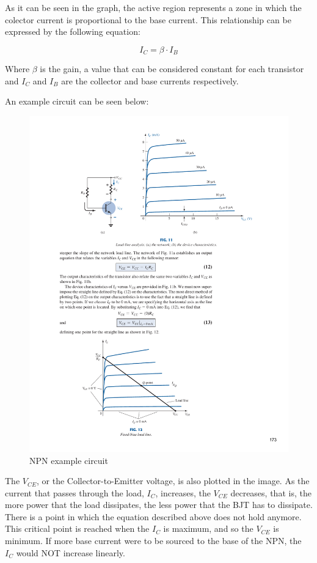 As it can be seen in the graph, the active region represents a zone in which the colector current is proportional to the base current. This relationship can be expressed by the following equation:

\begin{equation*}
    I_C = \beta \cdot I_B
\end{equation*}

\noindent Where $\beta$ is the gain, a value that can be considered constant for each transistor and $I_C$ and $I_B$ are the collector and base currents respectively. \medskip

An example circuit can be seen below:

\begin{figure}[H]
    \centering
    \includegraphics[scale = 1]{Graphics/VHDL/Practice 8/BJT/NPN_CIRCUIT.pdf}
    \caption{NPN example circuit~\autocite{BOYLESTAD}}
    \label{fig:NPN_EXAMPLE}
\end{figure}

The $V_{CE}$, or the Collector-to-Emitter voltage, is also plotted in the image. As the current that passes through the load, $I_C$, increases, the $V_{CE}$ decreases, that is, the more power that the load dissipates, the less power that the BJT has to dissipate. There is a point in which the equation described above does not hold anymore. This critical point is reached when the $I_C$ is maximum, and so the $V_{CE}$ is minimum. If more base current were to be sourced to the base of the NPN, the $I_C$ would NOT increase linearly.\medskip


